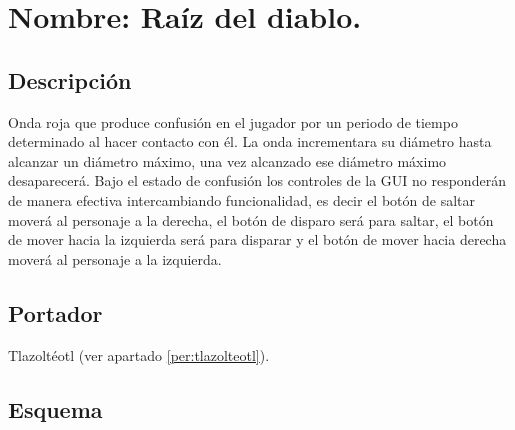 \section{Nombre: Raíz del diablo.}\label{hab.RaizDia}
\subsection{Descripción}
Onda roja que produce confusión en el jugador por un periodo de tiempo determinado al hacer contacto con él. La onda incrementara su diámetro hasta alcanzar un diámetro máximo, una vez alcanzado ese diámetro máximo desaparecerá. Bajo el estado de confusión los controles de la GUI no responderán de manera efectiva intercambiando funcionalidad, es decir el botón de saltar moverá al personaje a la derecha, el botón de disparo será para saltar, el botón de mover hacia la izquierda será para disparar y el botón de mover hacia derecha moverá al personaje a la izquierda. 
\subsection{Portador}
Tlazoltéotl (ver apartado \ref{per:tlazolteotl}).
\subsection{Esquema}
			